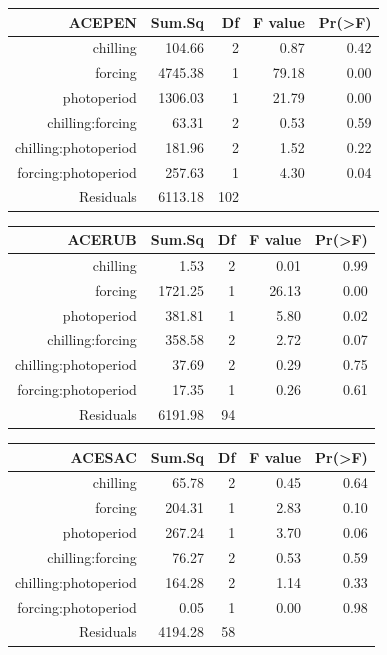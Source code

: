\documentclass{article}\usepackage[]{graphicx}\usepackage[]{color}
\begin{document}
\begin{table}[ht]
\centering
\begin{tabular}{rrrrr}
  \hline
  ACEPEN & Sum.Sq & Df & F value & Pr(>F) \\
 \hline
chilling & 104.66 &   2 & 0.87 & 0.42 \\ 
  forcing & 4745.38 &   1 & 79.18 & 0.00 \\ 
  photoperiod & 1306.03 &   1 & 21.79 & 0.00 \\ 
  chilling:forcing & 63.31 &   2 & 0.53 & 0.59 \\ 
  chilling:photoperiod & 181.96 &   2 & 1.52 & 0.22 \\ 
  forcing:photoperiod & 257.63 &   1 & 4.30 & 0.04 \\ 
  Residuals & 6113.18 & 102 &  &  \\ 
   \hline
\end{tabular}
\end{table}
\begin{table}[ht]
\centering
\begin{tabular}{rrrrr}
  \hline
  ACERUB & Sum.Sq & Df & F value & Pr(>F) \\
 \hline
chilling & 1.53 &   2 & 0.01 & 0.99 \\ 
  forcing & 1721.25 &   1 & 26.13 & 0.00 \\ 
  photoperiod & 381.81 &   1 & 5.80 & 0.02 \\ 
  chilling:forcing & 358.58 &   2 & 2.72 & 0.07 \\ 
  chilling:photoperiod & 37.69 &   2 & 0.29 & 0.75 \\ 
  forcing:photoperiod & 17.35 &   1 & 0.26 & 0.61 \\ 
  Residuals & 6191.98 &  94 &  &  \\ 
   \hline
\end{tabular}
\end{table}
\begin{table}[ht]
\centering
\begin{tabular}{rrrrr}
  \hline
  ACESAC & Sum.Sq & Df & F value & Pr(>F) \\
 \hline
chilling & 65.78 &   2 & 0.45 & 0.64 \\ 
  forcing & 204.31 &   1 & 2.83 & 0.10 \\ 
  photoperiod & 267.24 &   1 & 3.70 & 0.06 \\ 
  chilling:forcing & 76.27 &   2 & 0.53 & 0.59 \\ 
  chilling:photoperiod & 164.28 &   2 & 1.14 & 0.33 \\ 
  forcing:photoperiod & 0.05 &   1 & 0.00 & 0.98 \\ 
  Residuals & 4194.28 &  58 &  &  \\ 
   \hline
\end{tabular}
\end{table}
\end{document}
